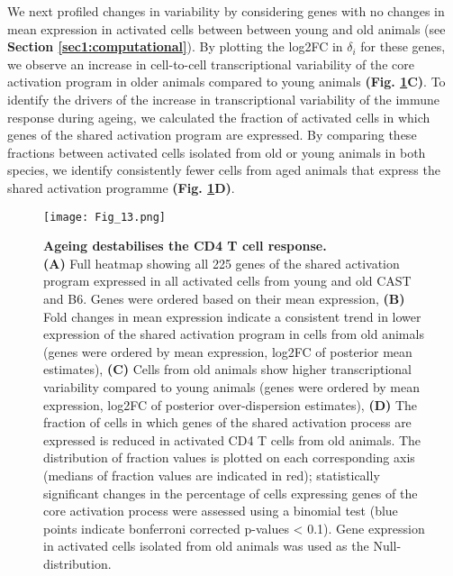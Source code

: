 We next profiled changes in variability by considering genes with no changes in mean expression in activated cells between between young and old animals (see \textbf{Section \ref{sec1:computational}}). By plotting the log2FC in $\delta_i$ for these genes, we observe an increase in cell-to-cell transcriptional variability of the core activation program in older animals compared to young animals \textbf{(Fig. \ref{fig1:variability_ageing}C)}. To identify the drivers of the increase in transcriptional variability of the immune response during ageing, we calculated the fraction of activated cells in which genes of the shared activation program are expressed. By comparing these fractions between activated cells isolated from old or young animals in both species, we identify consistently fewer cells from aged animals that express the shared activation programme \textbf{(Fig. \ref{fig1:variability_ageing}D)}. \\

\newpage

\begin{figure}[!ht]
\centering
\texttt{[image: Fig\_13.png]}
\caption[Ageing destabilises the CD4\plus{} T cell response]{\textbf{Ageing destabilises the CD4\plus{} T cell response.} \\
\textbf{(A)} Full heatmap showing all 225 genes of the shared activation program expressed in all activated cells from young and old CAST and B6. Genes were ordered based on their mean expression, \textbf{(B)} Fold changes in mean expression indicate a consistent trend in lower expression of the shared activation program in cells from old animals (genes were ordered by mean expression, log2FC of posterior mean estimates), \textbf{(C)} Cells from old animals show higher transcriptional variability compared to young animals (genes were ordered by mean expression, log2FC of posterior over-dispersion estimates), \textbf{(D)} The fraction of cells in which genes of the shared activation process are expressed is reduced in activated CD4\plus{} T cells from old animals. The distribution of fraction values is plotted on each corresponding axis (medians of fraction values are indicated in red); statistically significant changes in the percentage of cells expressing genes of the core activation process were assessed using a binomial test (blue points indicate bonferroni corrected p-values < 0.1). Gene expression in activated cells isolated from old animals was used as the Null-distribution.}
\label{fig1:variability_ageing}
\end{figure}

